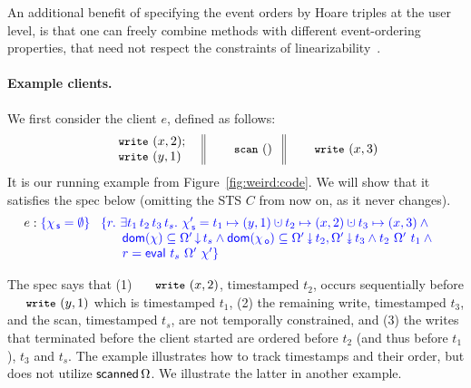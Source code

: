 An additional benefit of specifying the event orders by Hoare triples
at the user level, is that one can freely combine methods with
different event-ordering properties, that need not respect the
constraints of linearizability~\cite{SergeyNBD+OOPSLA16}.

\paragraph*{Example clients.}

We first consider the client $e$, defined as follows:
%
\[
\begin{array}{l||l||l}
        \begin{array}{c}
         \esc{write}~(x,2);\\ 
         \esc{write}~(y,1)~ 
        \end{array}~
& ~\esc{scan}~()~ &~\esc{write}~(x,3)  
\end{array}
\]
%
It is our running example from Figure~\ref{fig:weird:code}. We will
show that it satisfies the spec below (omitting the STS $C$ from now
on, as it never changes).
%
{\small
\[
\!\!\!\begin{array}{l}
e : 
  \tsPre{\{ \histS = \hempty \}} \
\begin{array}[t]{l}
  \tsPos{\{ r\ldot\, \exists t_1\, t_2\, t_3\, t_s \ldot\, 
    \histS' = t_1 \hpts (y,1) \hunion t_2 
    \hpts (x,2) \hunion t_3 \hpts (x,3) \wedge \hbox{}}\\
  \tsPos{\hphantom{\{ r\ldot\,\ \ }%
  \!\!\! \dom{\hist} \subseteq \ideal{\stableorderP}{t_s} \wedge
         \dom{\histO} \subseteq \sideal{\stableorderP}{t_2}, \sideal{\stableorderP}{t_3} \wedge 
%
    t_2\ {\stableorderP}\ t_1 \wedge \hbox{}}\\
   \tsPos{\hphantom{\{ r\ldot\,\ \ }
   \!\!\! r = \eval\ t_s\ \stableorderP\ \histP \}}\\
\end{array}
\end{array}
\]}


The spec says that (1) $\esc{write}~(x,2)$, timestamped $t_2$, occurs
sequentially before $\esc{write}~(y,1)$ which is timestamped $t_1$,
(2) the remaining write, timestamped $t_3$, and the scan, timestamped
$t_s$, are not temporally constrained, and (3) the writes that
terminated before the client started are ordered before $t_2$ (and
thus before $t_1$), $t_3$ and $t_s$. The example illustrates how
to track timestamps and their order, but does not utilize
$\mathsf{scanned}\,\Omega$. We illustrate the latter in another example.


